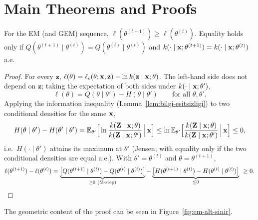 \documentclass[main.tex]{subfiles}
\begin{document}
\section{Main Theorems and Proofs}

\begin{theorem}\label{thm:em-monoton}
For the EM (and GEM) sequence, $\ell(\theta^{(t+1)})\ge\ell(\theta^{(t)})$. Equality holds only if $Q(\theta^{(t+1)}\mid\theta^{(t)})=Q(\theta^{(t)}\mid\theta^{(t)})$ and $k(\cdot\mid\mathbf{x};\theta^{(t+1)})=k(\cdot\mid\mathbf{x};\theta^{(t)})$ a.e.
\end{theorem}
\begin{proof}
For every $\mathbf z$, $\ell(\theta)=\ell_c(\theta;\mathbf{x},\mathbf z)-\ln k(\mathbf z\mid\mathbf{x};\theta)$. The left-hand side does not depend on $\mathbf z$; taking the expectation of both sides under $k(\cdot\mid\mathbf{x};\theta')$,
\[
\ell(\theta)=Q(\theta\mid\theta')-H(\theta\mid\theta')\qquad\text{for all }\theta,\theta'.
\]
Applying the information inequality (Lemma~\ref{lem:bilgi-esitsizligi}) to two conditional densities for the same $\mathbf{x}$,
\[
H(\theta\mid\theta')-H(\theta'\mid\theta')=\mathbb{E}_{\theta'}\Big[\ln\frac{k(\mathbf Z\mid\mathbf{x};\theta)}{k(\mathbf Z\mid\mathbf{x};\theta')}\,\Big|\,\mathbf{x}\Big]\le\ln\mathbb{E}_{\theta'}\Big[\frac{k(\mathbf Z\mid\mathbf{x};\theta)}{k(\mathbf Z\mid\mathbf{x};\theta')}\,\Big|\,\mathbf{x}\Big]\le0,
\]
i.e.\ $H(\cdot\mid\theta')$ attains its maximum at $\theta'$ (Jensen; with equality only if the two conditional densities are equal a.e.). With $\theta'=\theta^{(t)}$ and $\theta=\theta^{(t+1)}$,
\[
\ell(\theta^{(t+1)})-\ell(\theta^{(t)})=\underbrace{\big[Q(\theta^{(t+1)}\mid\theta^{(t)})-Q(\theta^{(t)}\mid\theta^{(t)})\big]}_{\ge0\ \text{(M-step)}}-\underbrace{\big[H(\theta^{(t+1)}\mid\theta^{(t)})-H(\theta^{(t)}\mid\theta^{(t)})\big]}_{\le0}\ \ge0 .
\qedhere
\]
\end{proof}

The geometric content of the proof can be seen in Figure~\ref{fig:em-alt-sinir}.
\end{document}

